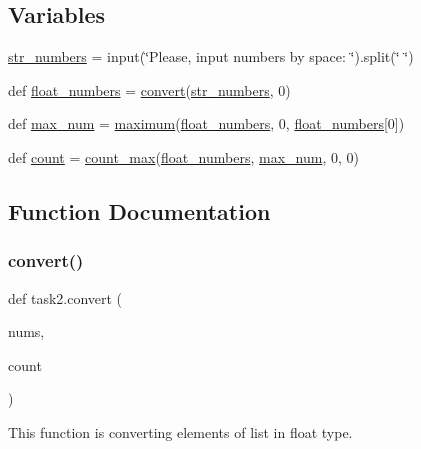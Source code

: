 \subsection*{Variables}
\begin{DoxyCompactItemize}
\item 
\hyperlink{namespacetask2_aee44793e4ddf40f20f98530ae0b2fa1c}{str\+\_\+numbers} = input(\char`\"{}Please, input numbers by space\+: \char`\"{}).split(\char`\"{} \char`\"{})
\item 
def \hyperlink{namespacetask2_a4a4aea5068f8e25b43a1da9687dc3d67}{float\+\_\+numbers} = \hyperlink{namespacetask2_a6698f7ee88d947ca7895225fc6ed9aad}{convert}(\hyperlink{namespacetask2_aee44793e4ddf40f20f98530ae0b2fa1c}{str\+\_\+numbers}, 0)
\item 
def \hyperlink{namespacetask2_a6be05602bf574a03f0308429ac474e97}{max\+\_\+num} = \hyperlink{namespacetask2_aa94c3ce489fe794dd806b09fe421e570}{maximum}(\hyperlink{namespacetask2_a4a4aea5068f8e25b43a1da9687dc3d67}{float\+\_\+numbers}, 0, \hyperlink{namespacetask2_a4a4aea5068f8e25b43a1da9687dc3d67}{float\+\_\+numbers}\mbox{[}0\mbox{]})
\item 
def \hyperlink{namespacetask2_acffac0045062e2fa5bd88e9d7303e0e4}{count} = \hyperlink{namespacetask2_a1003a8330a59d03e5b6bad23dbc3c2f8}{count\+\_\+max}(\hyperlink{namespacetask2_a4a4aea5068f8e25b43a1da9687dc3d67}{float\+\_\+numbers}, \hyperlink{namespacetask2_a6be05602bf574a03f0308429ac474e97}{max\+\_\+num}, 0, 0)
\end{DoxyCompactItemize}


\subsection{Function Documentation}
\mbox{\label{namespacetask2_a6698f7ee88d947ca7895225fc6ed9aad}} 
\subsubsection{\texorpdfstring{convert()}{convert()}}
{\footnotesize\ttfamily def task2.\+convert (\begin{DoxyParamCaption}\item[{}]{nums,  }\item[{}]{count }\end{DoxyParamCaption})}



This function is converting elements of list in float type. 


